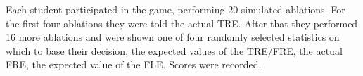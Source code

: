 Each student participated in the game, performing 20 simulated ablations. For the first four ablations they were told the 
actual \gls{TRE}. After that they performed 16 more ablations and were shown one of four randomly selected statistics on which to base their decision,
the expected values of the TRE/FRE, the actual FRE, the expected value of the FLE. Scores were recorded.

